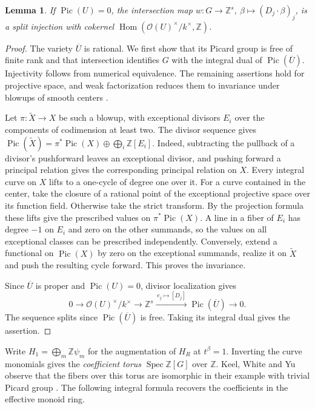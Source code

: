 \documentclass[11pt,reqno]{amsart}
\numberwithin{equation}{section}
\newtheorem{lemma}[theorem]{Lemma}
\theoremstyle{definition}
\theoremstyle{remark}
\DeclareMathOperator{\Spec}{Spec}
\DeclareMathOperator{\Pic}{Pic}
\begin{document}
\begin{lemma}\label{lem:integral-boundary-pairing}
If \(\Pic(U)=0\), the intersection map
\(w:G\to\mathbb Z^s,\ \beta\mapsto(D_j\cdot\beta)_j\), is a split
injection with cokernel
\(\operatorname{Hom}(\mathcal O(U)^\times/k^\times,\mathbb Z)\).
\end{lemma}
\begin{proof}
The variety \(\overline U\) is rational. We first show that its Picard group is
free of finite rank and that intersection identifies \(G\) with the
integral dual of \(\Pic(\overline U)\). Injectivity follows from numerical
equivalence. The remaining assertions hold for projective space,
and weak factorization reduces them to invariance under blowups
of smooth centers \cite[Theorem~0.1.1]{AKMW}.

Let \(\pi:\widetilde X\to X\) be such a blowup, with exceptional
divisors \(E_i\) over the components of codimension at least two.
The divisor sequence gives
\(\Pic(\widetilde X)=\pi^*\Pic(X)\oplus\bigoplus_i\mathbb Z[E_i]\).
Indeed, subtracting the pullback of a divisor's pushforward leaves an
exceptional divisor, and pushing forward a principal relation gives
the corresponding principal relation on \(X\).
Every integral curve on \(X\) lifts to a one-cycle of degree one over
it. For a curve contained in the center, take the closure of a rational
point of the exceptional projective space over its function field.
Otherwise take the strict transform. By the projection formula these
lifts give the prescribed values on \(\pi^*\Pic(X)\). A line in a
fiber of \(E_i\) has degree \(-1\) on \(E_i\) and zero on the other
summands, so the values on all exceptional classes can be prescribed
independently. Conversely, extend a functional on \(\Pic(X)\) by
zero on the exceptional summands, realize it on \(\widetilde X\)
and push the resulting cycle forward. This proves the invariance.

Since \(\overline U\) is proper and \(\Pic(U)=0\), divisor localization gives
\[ 0\longrightarrow \mathcal O(U)^\times/k^\times\longrightarrow \mathbb Z^s\xrightarrow{\,e_j\mapsto[D_j]\,}\Pic(\overline U)\longrightarrow0 . \]
The sequence splits since \(\Pic(\overline U)\) is free. Taking its integral
dual gives the assertion.
\end{proof}

Write \(H_1=\bigoplus_m\mathbb Z\psi_m\) for the augmentation of
\(H_R\) at \(t^\beta=1\). Inverting the curve monomials gives the
\emph{coefficient torus} \(\Spec\mathbb Z[G]\) over \(\mathbb Z\).
Keel, White and Yu observe that the fibers over this torus
are isomorphic in their example with trivial Picard group
\cite[\S21, before Conjecture~21.9]{KWY}.
The following integral formula recovers the coefficients in the
effective monoid ring.
\end{document}
